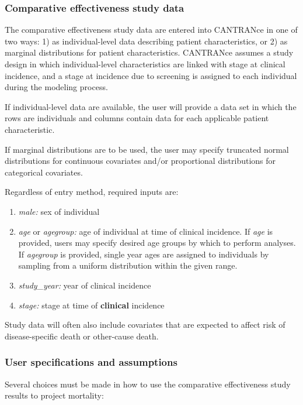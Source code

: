 \documentclass[11pt]{article}
\begin{document}
\subsubsection{Comparative effectiveness study data}

The comparative effectiveness study data are entered into CANTRANce in one of two ways: 1) as individual-level data describing patient characteristics, or 2) as marginal distributions for patient characteristics. 
CANTRANce assumes a study design in which individual-level characteristics are linked with stage at clinical incidence, and a stage at incidence due to screening is assigned to each individual during the modeling process.

If individual-level data are available, the user will provide a data set in which the rows are individuals and columns contain data for each applicable patient characteristic.

If marginal distributions are to be used, the user may specify truncated normal distributions for continuous covariates and/or proportional distributions for categorical covariates. 

Regardless of entry method, required inputs are:
\begin{enumerate}
    \item \emph{male:} sex of individual
    \item \emph{age} or \emph{agegroup:} age of individual at time of clinical incidence. If \emph{age} is provided, users may specify desired age groups by which to perform analyses. If \emph{agegroup} is provided, single year ages are assigned to individuals by sampling from a uniform distribution within the given range.
    \item \emph{study\_year:} year of clinical incidence
    \item \emph{stage:} stage at time of \textbf{clinical} incidence
\end{enumerate}
Study data will often also include covariates that are expected to affect risk of disease-specific death or other-cause death.

\subsubsection{User specifications and assumptions}
Several choices must be made in how to use the comparative effectiveness study results to project mortality:
			
\end{document}
